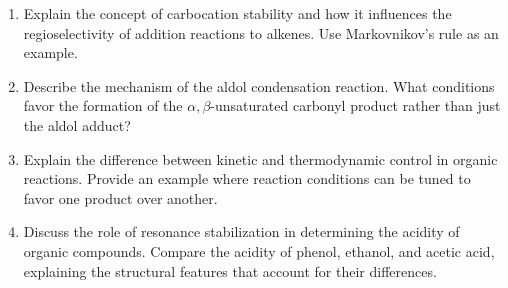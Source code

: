 \documentclass[11pt]{article}
\begin{document}
\begin{enumerate}[label=\textbf{\arabic*.}]
  \item Explain the concept of carbocation stability and how it influences the regioselectivity 
  of addition reactions to alkenes. Use Markovnikov's rule as an example.

  \item Describe the mechanism of the aldol condensation reaction. What conditions favor the 
  formation of the $\alpha,\beta$-unsaturated carbonyl product rather than just the aldol adduct?

  \item Explain the difference between kinetic and thermodynamic control in organic reactions. 
  Provide an example where reaction conditions can be tuned to favor one product over another.

  \item Discuss the role of resonance stabilization in determining the acidity of organic compounds. 
  Compare the acidity of phenol, ethanol, and acetic acid, explaining the structural features that 
  account for their differences.

\end{enumerate}
\end{document}
